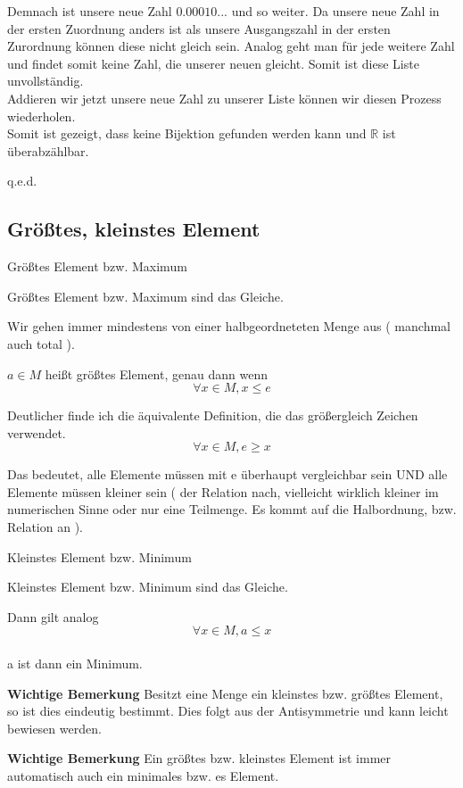 \documentclass[headsepline,12pt,a4paper]{scrartcl}
\begin{document}
\newpage


Demnach ist unsere neue Zahl $ 0.00010... $ und so weiter. Da unsere neue Zahl in der ersten Zuordnung anders ist als unsere Ausgangszahl in der ersten Zurordnung können diese nicht gleich sein. Analog geht man für jede weitere Zahl und findet somit keine Zahl, die unserer neuen gleicht. Somit ist diese Liste unvollständig. \\
Addieren wir jetzt unsere neue Zahl zu unserer Liste können wir diesen Prozess wiederholen. \\
Somit ist gezeigt, dass keine Bijektion gefunden werden kann und $ \mathbb{R} $ ist überabzählbar. 
\begin{flushright}
q.e.d.
\end{flushright}

\subsection*{Größtes, kleinstes Element}

\begin{center}
\item[Größtes Element bzw. Maximum]
\end{center}
\item Größtes Element bzw. Maximum sind das Gleiche.
\item Wir gehen immer mindestens von einer halbgeordneteten Menge aus ( manchmal auch total ).
\item $ a\in M$ heißt größtes Element, genau dann wenn $$ \forall x \in M , x \leq e $$
\item Deutlicher finde ich die äquivalente Definition, die das größergleich Zeichen verwendet.
$$ \forall x \in M, e \geq x $$
\item Das bedeutet, alle Elemente müssen mit e überhaupt vergleichbar sein UND alle Elemente müssen kleiner sein ( der Relation nach, vielleicht wirklich kleiner im numerischen Sinne oder nur eine Teilmenge. Es kommt auf die Halbordnung, bzw. Relation an ).


\newpage

\begin{center}
\item[Kleinstes Element bzw. Minimum]
\end{center}
\item Kleinstes Element bzw. Minimum sind das Gleiche.
\item Dann gilt analog $$ \forall x \in M, a \leq x $$ \\
 a ist dann ein Minimum.
\item \textbf{Wichtige Bemerkung} Besitzt eine Menge ein kleinstes bzw. größtes Element, so ist dies eindeutig bestimmt. Dies folgt aus der Antisymmetrie und kann leicht bewiesen werden.
\item \textbf{Wichtige Bemerkung} Ein größtes bzw. kleinstes Element ist immer automatisch auch ein minimales bzw.  es Element.
\end{document}
